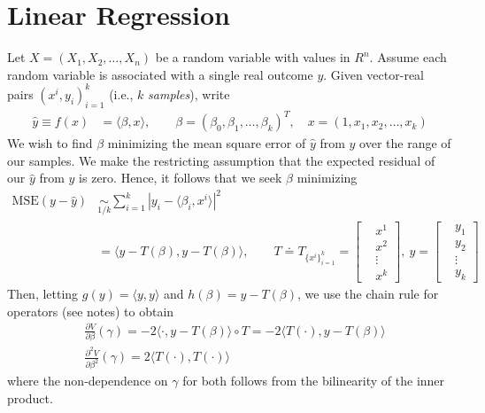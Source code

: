 \documentclass[12pt]{amsbook}
\newcommand{\p}{\partial}
\newcommand{\mse}{\mathrm{MSE}}
\theoremstyle{plain}
\theoremstyle{definition}
\theoremstyle{remark}
\numberwithin{equation}{section}  %
\numberwithin{equation}{section}  %
\begin{document}
\chapter{Linear Regression}
Let $X = (X_{1}, X_{2}, \dots, X_{n})$ be a random variable with values in 
$R^{n}$. Assume each random variable is associated with a single real
outcome $y$. Given vector-real pairs $\left( x^{i}, y_{i} \right)_{i=1}^{k}$
(i.e., $k$  
\textit{samples}), write
\begin{equation*}
\begin{split}
	\hat{y} \equiv f(x) & = \langle \beta, x \rangle, \qquad \beta =
	(\beta_{0}, \beta_{1}, \dots, \beta_{k})^{T}, \quad x = (1, x_{1}, x_{2},
	\dots, x_{k})  
\end{split}
\end{equation*}
We wish to find $\beta$ minimizing the mean square error of $\hat{y}$ from $y$ over the range of our samples. We make the restricting assumption that the expected
residual of our $\hat{y}$ from $y$ is zero. Hence, it follows that we seek 
$\beta$ minimizing
\begin{equation*}
\begin{split}
	\mse(y - \hat{y}) & \underset{1/k}{\sim} \sum_{i=1}^{k} | y_{i} - \langle \beta_{i}, x^{i} \rangle 
	|^{2}
	\\
	& = \langle y - T(\beta), y - T(\beta) \rangle , \qquad T \doteq
	T_{\{x^{i}\}_{i=1}^{k}} = \begin{bmatrix}
	& x^{1} \\
	& x^{2} \\
	& \vdots \\
	& x^{k}
	\end{bmatrix}, \
	y = \begin{bmatrix}
		& y_{1} 
		\\
		& y_{2}
		\\
		& \vdots
		\\
		& y_{k}
	\end{bmatrix}
\end{split}
\end{equation*}
Then, letting $g(y) = \langle y,y \rangle $ and $h(\beta) = y - T(\beta)$, we
use the chain rule for operators (see notes) to obtain
\begin{equation*}
\begin{split}
	& \frac{\p V}{\p \beta}(\gamma)  = -2 \langle \cdot, y - T(\beta)
	\rangle \circ T
	= -2 \langle T(\cdot), y - T(\beta) \rangle 
	\\
	& \frac{\p^{2} V}{\p \beta^{2}} (\gamma) = 2 \langle T(\cdot), T(\cdot) \rangle 
\end{split}
\end{equation*}
where the non-dependence on $\gamma$ for both follows from the bilinearity of the inner product. 
\end{document}
